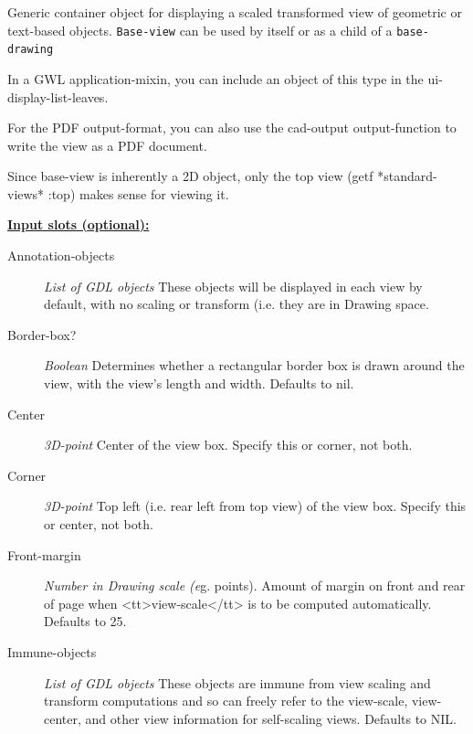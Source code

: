 \documentclass [11pt]{book}
\begin{document}
\begin{itemize}
\begin{description}
Generic container object for displaying a scaled transformed view of geometric or 
text-based objects. \texttt{Base-view} can be used by itself or as a child of a \texttt{base-drawing}

In a GWL application-mixin, you can include an object of this type in the ui-display-list-leaves.

For the PDF output-format, you can also use the cad-output output-function to write the 
view as a PDF document. 

Since base-view is inherently a 2D object, only the top view (getf *standard-views* :top) 
makes sense for viewing it.



\end{description}








\textbf{
\underline{Input slots (optional):}}

\begin{description}

\item [Annotation-objects]
\emph{List of GDL objects} These objects will be displayed in each view by default, with no scaling or transform (i.e. they are in Drawing space.


\item [Border-box?]
\emph{Boolean} Determines whether a rectangular border box is drawn around the view,
with the view's length and width. Defaults to nil.


\item [Center]
\emph{3D-point} Center of the view box. Specify this or corner, not both.


\item [Corner]
\emph{3D-point} Top left (i.e. rear left from top view) of the view box. Specify this or center, not both.


\item [Front-margin]
\emph{Number in Drawing scale (e}g. points). Amount of margin on front and rear
of page when <tt>view-scale</tt> is to be computed automatically. Defaults to 25.


\item [Immune-objects]
\emph{List of GDL objects} These objects are immune from view scaling and transform computations and so can freely refer
to the view-scale, view-center, and other view information for self-scaling views. Defaults to NIL.



\end{description}
\end{itemize}
\end{document}
